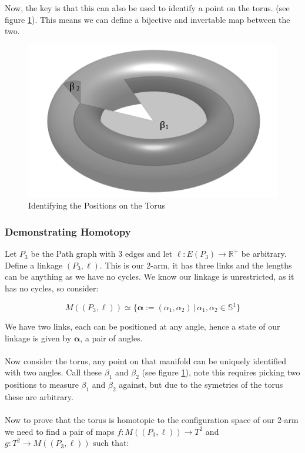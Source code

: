 \documentclass{article}
\begin{document}
\noindent Now, the key is that this can also be used to identify a point on the torus. (see figure \ref{fig:Torus Labeled Angles}). This means we can define a bijective and invertable map between the two.

\begin{figure}[h!]
\centering
\includegraphics[scale=0.4]{./images/torus_labeled_angles.png}
\caption{Identifying the Positions on the Torus}
\label{fig:Torus Labeled Angles}
\end{figure}

\subsubsection{Demonstrating Homotopy}

Let $P_3$ be the Path graph with 3 edges and let $\ell: E(P_3) \rightarrow \mathbb R^+$ be arbitrary. Define a linkage $(P_3,\ell)$. This is our 2-arm, it has three links and the lengths can be anything as we have no cycles. We know our linkage is unrestricted, as it has no cycles, so consider:

$$M((P_3,\ell)) \simeq \{ \boldsymbol{\alpha} := (\alpha_1, \alpha_2) \, | \, \alpha_1, \alpha_2 \in \mathbb S^1 \}$$ 

\noindent We have two links, each can be positioned at any angle, hence a state of our linkage is given by $\boldsymbol{\alpha}$, a pair of angles. \\\\ Now consider the torus, any point on that manifold can be uniquely identified with two angles. Call these $\beta_1$ and $\beta_2$ (see figure \ref{fig:Torus Labeled Angles}), note this requires picking two positions to measure $\beta_1$ and $\beta_2$ against, but due to the symetries of the torus these are arbitrary. \\\\ Now to prove that the torus is homotopic to the configuration space of our 2-arm we need to find a pair of maps $f: M((P_3,\ell)) \rightarrow T^2 $ and $g: T^2 \rightarrow M((P_3,\ell))$ such that:
\end{document}
